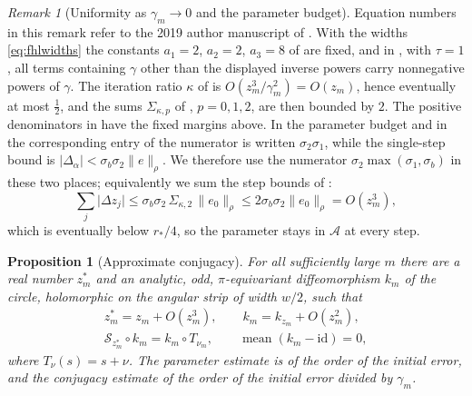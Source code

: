 \documentclass[11pt]{amsart}
\numberwithin{equation}{section}
\newtheorem{proposition}[theorem]{Proposition}
\theoremstyle{definition}
\theoremstyle{remark}
\newtheorem{remark}[theorem]{Remark}
\newcommand{\abs}[1]{\lvert #1\rvert}
\newcommand{\norm}[1]{\lVert #1\rVert}
\newcommand{\mean}{\operatorname{mean}}
\newcommand{\id}{\mathrm{id}}
\begin{document}
\begin{remark}[Uniformity as $\gamma_m\to0$ and the parameter budget]\label{rem:fhl}
Equation numbers in this remark refer to the 2019 author manuscript of \cite{FHL}. With the widths \eqref{eq:fhlwidths} the constants $a_1=2$, $a_2=2$, $a_3=8$ of \cite[(3.37)--(3.38)]{FHL} are fixed, and in \cite[(3.21), (3.22), (3.26)]{FHL}, with $\tau=1$, all terms containing $\gamma$ other than the displayed inverse powers carry nonnegative powers of $\gamma$. The iteration ratio $\kappa$ of \cite[(3.40)]{FHL} is $O(z_m^3/\gamma_m^2)=O(z_m)$, hence eventually at most $\frac12$, and the sums $\Sigma_{\kappa,p}$ of \cite[(3.41)]{FHL}, $p=0,1,2$, are then bounded by $2$. The positive denominators in \cite[(3.48)]{FHL} have the fixed margins above. In the parameter budget \cite[(3.43)]{FHL} and in the corresponding entry of \cite[(3.48)]{FHL} the numerator is written $\sigma_2\sigma_1$, while the single-step bound \cite[(3.23)]{FHL} is $\abs{\Delta_\alpha}<\sigma_b\sigma_2\norm e_\rho$. We therefore use the numerator $\sigma_2\max(\sigma_1,\sigma_b)$ in these two places; equivalently we sum the step bounds of \cite[Lemma~3.2]{FHL}:
\[
\sum_j\abs{\Delta z_j}\le\sigma_b\sigma_2\,\Sigma_{\kappa,2}\,\norm{e_0}_{\rho}\le2\sigma_b\sigma_2\norm{e_0}_{\rho}=O(z_m^3),
\]
which is eventually below $r_*/4$, so the parameter stays in $\mathcal A$ at every step.
\end{remark}

\begin{proposition}[Approximate conjugacy]\label{prop:d4conj}
For all sufficiently large $m$ there are a real number $z_m^*$ and an analytic, odd, $\pi$-equivariant diffeomorphism $k_m$ of the circle, holomorphic on the angular strip of width $w/2$, such that
\begin{equation}\label{eq:d4conj}
\begin{gathered}
z_m^*=z_m+O(z_m^3),\qquad k_m=k_{z_m}+O(z_m^2),\\
\mathcal S_{z_m^*}\circ k_m=k_m\circ T_{\nu_m},\qquad \mean(k_m-\id)=0,
\end{gathered}
\end{equation}
where $T_\nu(s)=s+\nu$. The parameter estimate is of the order of the initial error, and the conjugacy estimate of the order of the initial error divided by $\gamma_m$.
\end{proposition}
\end{document}
